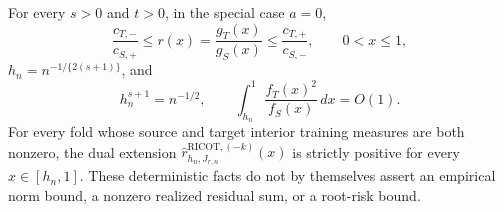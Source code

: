 For every \(s>0\) and \(t>0\), in the special case \(a=0\),
\[
\frac{c_{T,-}}{c_{S,+}}\le r(x)=\frac{g_T(x)}{g_S(x)}\le\frac{c_{T,+}}{c_{S,-}},\qquad 0<x\le1,
\]
\(h_n=n^{-1/\{2(s+1)\}}\), and
\[
h_n^{s+1}=n^{-1/2},\qquad \int_{h_n}^1\frac{f_T(x)^2}{f_S(x)}\,dx=O(1).
\]
For every fold whose source and target interior training measures are both nonzero, the dual extension \(\widehat r^{\mathrm{RICOT},(-k)}_{h_n,J_{r,n}}(x)\) is strictly positive for every \(x\in[h_n,1]\). These deterministic facts do not by themselves assert an empirical norm bound, a nonzero realized residual sum, or a root-risk bound.